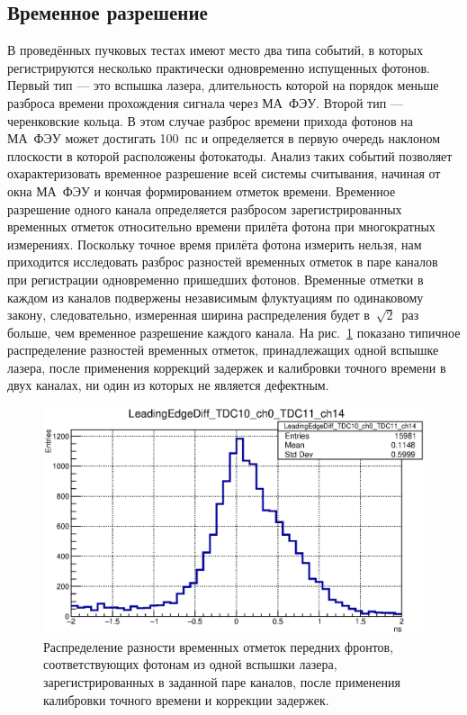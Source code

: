 \subsection{Временное разрешение}\label{section:TimeRes}

В проведённых пучковых тестах имеют место два типа событий, в которых регистрируются несколько практически одновременно испущенных фотонов. Первый тип --- это вспышка лазера, длительность которой на порядок меньше разброса времени прохождения сигнала через МА~ФЭУ. Второй тип --- черенковские кольца.
В этом случае разброс времени прихода фотонов на МА~ФЭУ может достигать 100~пс и определяется в первую очередь наклоном плоскости в которой расположены фотокатоды. Анализ таких событий позволяет охарактеризовать временное разрешение всей системы считывания, начиная от окна МА~ФЭУ и кончая формированием отметок времени. Временное разрешение одного канала определяется разбросом зарегистрированных временных отметок относительно времени прилёта фотона при многократных измерениях. Поскольку точное время прилёта фотона измерить нельзя, нам приходится исследовать разброс разностей временных отметок в паре каналов при регистрации одновременно пришедших фотонов. Временные отметки в каждом из каналов подвержены независимым флуктуациям по одинаковому закону, следовательно, измеренная ширина распределения будет в~$\sqrt 2$~раз больше, чем временное разрешение каждого канала. На рис.~\ref{fig:TimeRes} показано типичное распределение разностей временных отметок, принадлежащих одной вспышке лазера, после применения коррекций задержек и калибровки точного времени в двух каналах, ни один из которых не является дефектным.

\begin{figure}
\includegraphics[width=1.0\textwidth]{pictures/LeadingEdgeDiff_TDC10_ch0_TDC11_ch14_corr.eps}
\caption{Распределение разности временных отметок передних фронтов, соответствующих фотонам из одной вспышки лазера, зарегистрированных в заданной паре каналов, после применения калибровки точного времени и коррекции задержек.}
\label{fig:TimeRes}
\end{figure}

